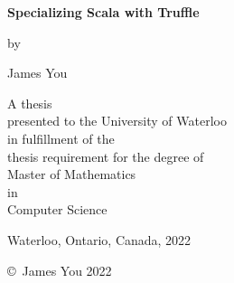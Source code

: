 \pagestyle{empty}

\begin{titlepage}
        \begin{center}
        \vspace*{1.0cm}

        \Huge
        {\bf Specializing Scala with Truffle}

        \vspace*{1.0cm}

        \normalsize
        by \\

        \vspace*{1.0cm}

        \Large
        James You \\

        \vspace*{3.0cm}

        \normalsize
        A thesis \\
        presented to the University of Waterloo \\ 
        in fulfillment of the \\
        thesis requirement for the degree of \\
        Master of Mathematics \\
        in \\
        Computer Science \\

        \vspace*{2.0cm}

        Waterloo, Ontario, Canada, 2022 \\

        \vspace*{1.0cm}

        \copyright\ James You 2022 \\
        \end{center}
\end{titlepage}

\pagestyle{plain}
\setcounter{page}{2}

